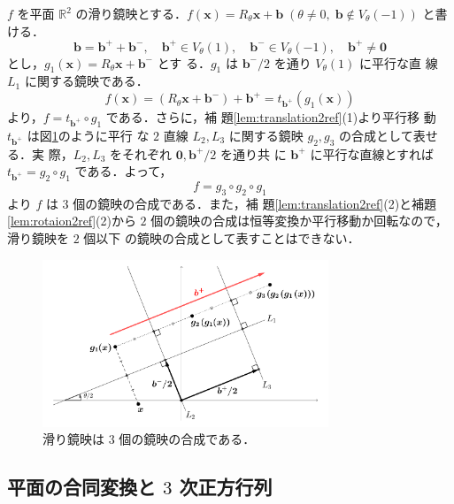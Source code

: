\documentclass[11pt, uplatex, dvipdfmx, titlepage]{jsarticle}
\makeatletter
\renewenvironment{proof}[1][\proofname]{\par
  \pushQED{\qed}%
  \normalfont \topsep6\p@\@plus6\p@\relax
  \trivlist
  \item[\hskip\labelsep
         \bfseries
    {#1}]\ignorespaces
}{%
  \popQED\endtrivlist\@endpefalse
}
\theoremstyle{definition}
\renewcommand{\proofname}{\textbf{証明}}
\makeatother
\begin{document}
\begin{proof}
  $f$ を平面 $\mathbb{R}^2$
  の滑り鏡映とする．$f(\bm{x}) = R_{\theta}\bm{x} + \bm{b} \; (\theta
  \neq 0, \; \bm{b} \notin V_{\theta}(-1))$ と書ける．
  \[
    \bm{b} = \bm{b}^{+} + \bm{b}^{-}, \quad \bm{b}^{+} \in
    V_{\theta}(1), \quad \bm{b}^{-} \in V_{\theta}(-1),
    \quad \bm{b}^{+} \neq \bm{0}
  \]
  とし，$g_1(\bm{x}) = R_{\theta} \bm{x} + \bm{b}^{-}$ とす
  る．$g_1$ は $\bm{b}^{-}/2$ を通り $V_{\theta}(1)$ に平行な直
  線 $L_1$ に関する鏡映である．
  \[
    f(\bm{x}) = \left( R_{\theta}\bm{x} + \bm{b}^{-}\right) +
    \bm{b}^{+} = t_{\bm{b}^{+}}\left( g_1(\bm{x})\right)
  \]
  より，$f=t_{\bm{b}^{+}}\circ g_1$ である．さらに，補
  題\ref{lem:translation2ref}(1)より平行移
  動 $t_{\bm{b}^{+}}$ は図\ref{fig:glide2ref}のように平行
  な $2$ 直線 $L_2, L_3$ に関する鏡映 $g_2, g_3$ の合成として表せる．実
  際，$L_2, L_3$ をそれぞれ $\bm{0}, \bm{b}^{+}/2$ を通り共
  に $\bm{b}^{+}$ に平行な直線とすれば $t_{\bm{b}^{+}} = g_2 \circ
  g_1$ である．よって，
  \[
    f = g_3 \circ g_2 \circ g_1
  \]
  より $f$ は $3$ 個の鏡映の合成である．また，補
  題\ref{lem:translation2ref}(2)と補題\ref{lem:rotaion2ref}(2)から $2$
  個の鏡映の合成は恒等変換か平行移動か回転なので，滑り鏡映を $2$ 個以下
  の鏡映の合成として表すことはできない．
  \begin{figure}[h]
    \centering
    \includegraphics[height=5cm]{pictures/glide2ref.pdf}
    \caption{滑り鏡映は $3$ 個の鏡映の合成である．}
    \label{fig:glide2ref}
  \end{figure}
\end{proof}



\subsection{平面の合同変換と $3$ 次正方行列}
\end{document}

